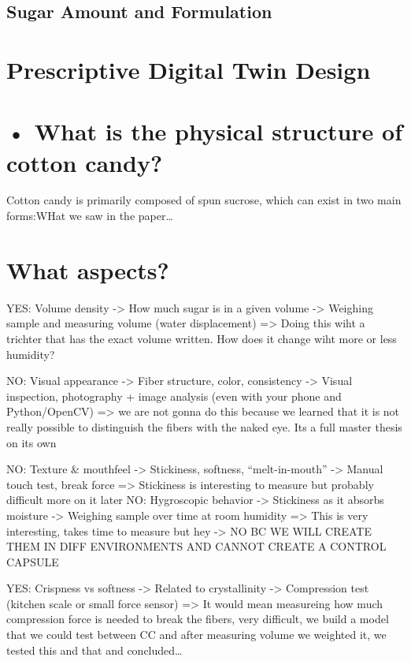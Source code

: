 \subsection{Sugar Amount and Formulation}

\section{Prescriptive Digital Twin Design}


\section{    •	What is the physical structure of cotton candy?}
Cotton candy is primarily composed of spun sucrose, which can exist in two main forms:WHat we saw in the paper\dots

\section{What aspects?}

YES: Volume density -> How much sugar is in a given volume -> Weighing sample and measuring volume (water displacement) => Doing this wiht a trichter that has the exact volume written. How does it change wiht more or less humidity?

NO: Visual appearance -> Fiber structure, color, consistency -> Visual inspection, photography + image analysis (even with your phone and Python/OpenCV) => we are not gonna do this because we learned that it is not really possible to distinguish the fibers with the naked eye. Its a full master thesis on its own

NO: Texture \& mouthfeel -> Stickiness, softness, “melt-in-mouth” -> Manual touch test, break force => Stickiness is interesting to measure but probably difficult more on it later 
NO: Hygroscopic behavior -> Stickiness as it absorbs moisture -> Weighing sample over time at room humidity => This is very interesting, takes time to measure but hey -> NO BC WE WILL CREATE THEM IN DIFF ENVIRONMENTS AND CANNOT CREATE A CONTROL CAPSULE

YES: Crispness vs softness -> Related to crystallinity -> Compression test (kitchen scale or small force sensor) => It would mean measureing how much compression force is needed to break the fibers, very difficult, we build a model that we could test between CC and after measuring volume we weighted it, we tested this and that and concluded\dots


